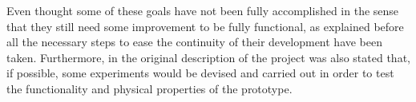 Even thought some of these goals have not been fully accomplished in the sense that they still need some improvement to be fully functional, as explained before all the necessary steps to ease the continuity of their development have been taken.
Furthermore, in the original description of the project was also stated that, if possible, some experiments would be devised and carried out in order to test the functionality and physical properties of the prototype. 
